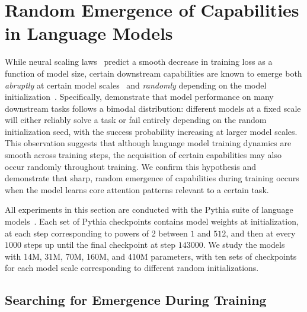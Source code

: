 \documentclass{article}
\begin{document}
\section{Random Emergence of Capabilities in Language Models}
\label{sec:emergence}

While neural scaling laws~\citep{kaplan2020scalinglawsneurallanguage, hestness2017deeplearningscalingpredictable} predict a smooth decrease in training loss as a function of model size, certain downstream capabilities are known to emerge both \textit{abruptly} at certain model scales~\citep{wei2022emergentabilitieslargelanguage} and \textit{randomly} depending on the model initialization~\citep{zhao2026randomscalingemergentcapabilities}. Specifically, \citet{zhao2026randomscalingemergentcapabilities} demonstrate that model performance on many downstream tasks follows a bimodal distribution: different models at a fixed scale will either reliably solve a task or fail entirely depending on the random initialization seed, with the success probability increasing at larger model scales. This observation suggests that although language model training dynamics are smooth across training steps, the acquisition of certain capabilities may also occur randomly throughout training. We confirm this hypothesis and demonstrate that sharp, random emergence of capabilities during training occurs when the model learns core attention patterns relevant to a certain task.

All experiments in this section are conducted with the Pythia suite of language models~\citep{biderman2023pythiasuiteanalyzinglarge}. Each set of Pythia checkpoints contains model weights at initialization, at each step corresponding to powers of 2 between $1$ and $512$, and then at every $1000$ steps up until the final checkpoint at step $143000$. We study the models with 14M, 31M, 70M, 160M, and 410M parameters, with ten sets of checkpoints for each model scale corresponding to different random initializations.

\subsection{Searching for Emergence During Training}
\label{sec:emergence_search}
\end{document}
